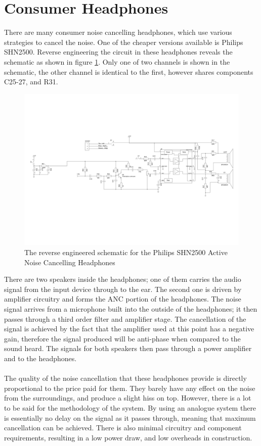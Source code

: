 \section{Consumer Headphones}
There are many consumer noise cancelling headphones, which use various strategies to cancel the noise.
One of the cheaper versions available is Philips SHN2500.
Reverse engineering the circuit in these headphones reveals the schematic as shown in figure \ref{fig:philipsphonessche}.
Only one of two channels is shown in the schematic, the other channel is identical to the first, however shares components C25-27, and R31.
\\
\begin{figure}
	\centering
	\includegraphics[width=\textwidth]{./img/hp.pdf}
	\caption{The reverse engineered schematic for the Philips SHN2500 Active Noise Cancelling Headphones}
	\label{fig:philipsphonessche}
\end{figure}

\noindent
There are two speakers inside the headphones; one of them carries the audio signal from the input device through to the ear.
The second one is driven by amplifier circuitry and forms the ANC portion of the headphones.
The noise signal arrives from a microphone built into the outside of the headphones; it then passes through a third order filter and amplifier stage.
The cancellation of the signal is achieved by the fact that the amplifier used at this point has a negative gain, therefore the signal produced will be anti-phase when compared to the sound heard.
The signals for both speakers then pass through a power amplifier and to the headphones.
\\
\\
The quality of the noise cancellation that these headphones provide is directly proportional to the price paid for them. They barely have any effect on the noise from the surroundings, and produce a slight hiss on top.
However, there is a lot to be said for the methodology of the system. By using an analogue system there is essentially no delay on the signal as it passes through, meaning that maximum cancellation can be achieved.
There is also minimal circuitry and component requirements, resulting in a low power draw, and low overheads in construction.
